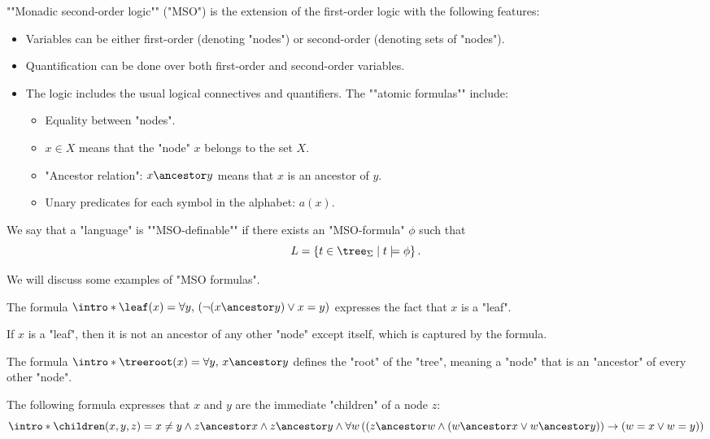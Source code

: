 \documentclass[a4paper,UKenglish,cleveref, autoref, thm-restate]{lipics-v2021}
\begin{document}
\begin{definition}
	\AP ""Monadic second-order logic"" (\reintro*"MSO") is the extension of the first-order logic with the following features:
	\begin{itemize}
		\item Variables can be either first-order (denoting "nodes") or second-order (denoting sets of "nodes").
		\item Quantification can be done over both first-order and second-order variables.
		\item The logic includes the usual logical connectives and quantifiers.
		      \itemAP The ""atomic formulas"" include:
		      \begin{itemize}
			      \item Equality between "nodes".
			      \item $x \in X$ means that the "node" $x$ belongs to the set $X$.
			      \item "Ancestor relation": $x \ancestor y$ means that $x$ is an ancestor of $y$.
			      \item Unary predicates for each symbol in the alphabet: $a(x)$.
		      \end{itemize}
	\end{itemize}
\end{definition}

\begin{definition}
	\AP We say that a "language" is ""MSO-definable"" if there exists an "MSO-formula" $\phi$ such that
	\[
		L = \setdef{t \in \tree_{\Sigma}}{t \models \phi}.
	\]
\end{definition}


We will discuss some examples of "MSO formulas".

\begin{example}
	\AP The formula $\intro* \leaf(x) = \forall y,\, (\lnot(x \ancestor y) \lor x = y)$ expresses the fact that $x$ is a "leaf".

	If $x$ is a "leaf", then it is not an ancestor of any other "node" except itself, which is captured by the formula.
\end{example}

\begin{example}
	\AP The formula $\intro* \treeroot(x) = \forall y,\, x \ancestor y$ defines the "root" of the "tree",
	meaning a "node" that is an "ancestor" of every other "node".
\end{example}

\begin{example}
	\AP The following formula expresses that $x$ and $y$ are the immediate "children" of a node $z$:
	\[
		\intro* \children(x,y,z) =
		x \neq y \land
		z \ancestor x \land  z \ancestor y \land
		\forall w
		\left( \left(
			z \ancestor w \land
				(w \ancestor x \lor w \ancestor  y) \right) \rightarrow (
			w = x \lor w = y
			)
		\right)
	\]
\end{example}
\end{document}
